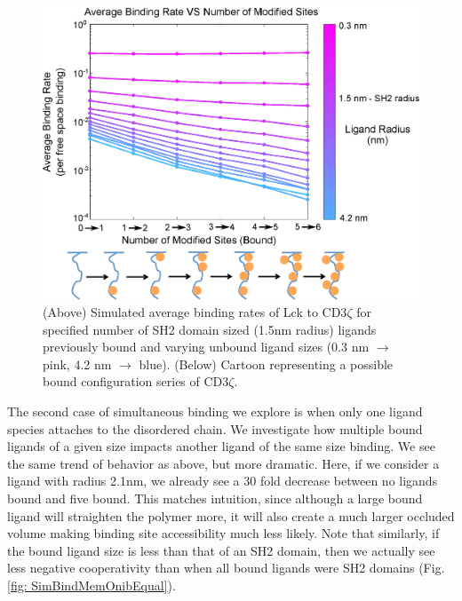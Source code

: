 \documentclass[../../AdvancementSummary.tex]{subfiles}
\begin{document}
\begin{figure}
	\begin{center}
		\includegraphics[width=\linewidth]{ResultsFigures/CD3ZetaMultipleBindingMembraneOn/AvgBindVSTotalPhosColorMapLabeled.eps}
		\caption{(Above) Simulated average binding rates of Lck to CD3$\zeta$ for specified number of SH2 domain sized (1.5nm radius) ligands previously bound and varying unbound ligand sizes (0.3 nm $\rightarrow$ pink, 4.2 nm $	\rightarrow$ blue). (Below) Cartoon representing a possible bound configuration series of CD3$\zeta$. \label{fig: SimBindMemOnSH2} }
	\end{center}
\end{figure}


The second case of simultaneous binding we explore is when only one ligand species attaches to the disordered chain. We investigate how multiple bound ligands of a given size impacts another ligand of the same size binding. We see the same trend of behavior as above, but more dramatic. Here, if we consider a ligand with radius 2.1nm, we already see a 30 fold decrease between no ligands bound and five bound. This matches intuition, since although a large bound ligand will straighten the polymer more, it will also create a much larger occluded volume making binding site accessibility much less likely. Note that similarly, if the bound ligand size is less than that of an SH2 domain, then we actually see less negative cooperativity than when all bound ligands were SH2 domains (Fig. \ref{fig: SimBindMemOnibEqual}).
\end{document}
